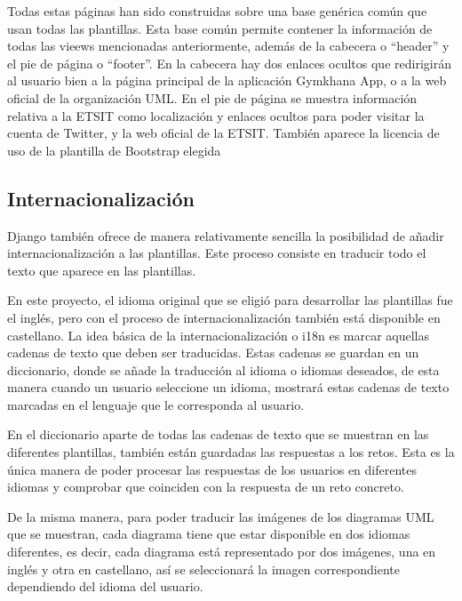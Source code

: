 \documentclass[a4paper, 12pt]{book}
\begin{document}
Todas estas páginas han sido construidas sobre una base genérica común que usan todas las plantillas. Esta base común permite contener la información de todas las vieews mencionadas anteriormente, además de la cabecera o ``header'' y el pie de página o ``footer''. En la cabecera hay dos enlaces ocultos que redirigirán al usuario bien a la página principal de la aplicación Gymkhana App, o a la web oficial de la organización UML. En el pie de página se muestra información relativa a la ETSIT como localización y enlaces ocultos para poder visitar la cuenta de Twitter, y la web oficial de la ETSIT. También aparece la licencia de uso de la plantilla de Bootstrap elegida

\subsection{Internacionalización}
Django también ofrece de manera relativamente sencilla la posibilidad de añadir internacionalización a las plantillas. Este proceso consiste en traducir todo el texto que aparece en las plantillas. 

En este proyecto, el idioma original que se eligió para desarrollar las plantillas fue el inglés, pero con el proceso de internacionalización también está disponible en castellano. La idea básica de la internacionalización o i18n es marcar aquellas cadenas de texto que deben ser traducidas. Estas cadenas se guardan en un diccionario, donde se añade la traducción al idioma o idiomas deseados, de esta manera cuando un usuario seleccione un idioma, mostrará estas cadenas de texto marcadas en el lenguaje que le corresponda al usuario. 

En el diccionario aparte de todas las cadenas de texto que se muestran en las diferentes plantillas, también están guardadas las respuestas a los retos. Esta es la única manera de poder procesar las respuestas de los usuarios en diferentes idiomas y comprobar que coinciden con la respuesta de un reto concreto. 

De la misma manera, para poder traducir las imágenes de los diagramas UML que se muestran, cada diagrama tiene que estar disponible en dos idiomas diferentes, es decir, cada diagrama está representado por dos imágenes, una en inglés y otra en castellano, así se seleccionará la imagen correspondiente dependiendo del idioma del usuario. 
\end{document}
